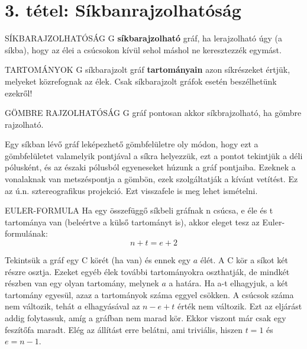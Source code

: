 \section{3. tétel: Síkbanrajzolhatóság}

\begin{definicio}{SÍKBARAJZOLHATÓSÁG}
G \textbf{síkbarajzolható} gráf, ha lerajzolható úgy (a síkba), hogy az élei a csúcsokon kívül sehol máshol ne keresztezzék egymást.
\end{definicio}

\begin{definicio}{TARTOMÁNYOK}
G síkbarajzolt gráf \textbf{tartományain} azon síkrészeket értjük, melyeket közrefognak az élek. Csak síkbarajzolt gráfok esetén beszélhetünk ezekről!
\end{definicio}

\begin{tetel}{GÖMBRE RAJZOLHATÓSÁG}
G gráf pontosan akkor síkbrajzolható, ha gömbre rajzolható.
\end{tetel}

\begin{bizonyitas}{}
Egy síkban lévő gráf leképezhető gömbfelületre oly módon, hogy ezt a gömbfelületet valamelyik pontjával a síkra helyezzük, ezt a pontot tekintjük a déli pólusként, és az északi pólusból egyeneseket húzunk a gráf pontjaiba. Ezeknek a vonalaknak van metszéspontja a gömbön, ezek szolgáltatják a kívánt vetítést. Ez az ú.n. sztereografikus projekció. Ezt visszafele is meg lehet ismételni.
\end{bizonyitas}

\begin{tetel}{EULER-FORMULA}
Ha egy összefüggő síkbeli gráfnak n csúcsa, e éle és t tartománya van (beleértve a külső tartományt is), akkor eleget tesz az Euler-formulának:
$$n + t = e + 2$$
\end{tetel}

\begin{bizonyitas}{}
Tekintsük a gráf egy C körét (ha van) és ennek egy $a$ élét. A C kör a síkot két részre osztja. Ezeket egyéb élek további tartományokra oszthatják, de mindkét részben van egy olyan tartomány, melynek $a$ a határa. Ha a-t elhagyjuk, a két tartomány egyesül, azaz a tartományok száma eggyel csökken. A csúcsok száma nem változik, tehát $a$ elhagyásával az $n - e + t$ érték nem változik. Ezt az eljárást addig folytassuk, amíg a gráfban nem marad kör. Ekkor viszont már csak egy feszítőfa maradt. Elég az állítást erre belátni, ami triviális, hiszen $t = 1$ és $e = n - 1$.
\end{bizonyitas}

